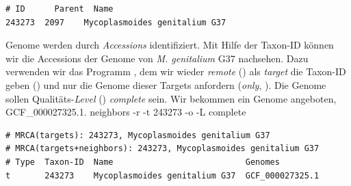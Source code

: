 \begin{verbatim}
# ID      Parent  Name
243273  2097    Mycoplasmoides genitalium G37
\end{verbatim}
\nwenddocs{}\nwdocspar
Genome werden durch \emph{Accessions} identifiziert. Mit Hilfe der
Taxon-ID können wir die Accessions der Genome von \emph{M. genitalium}
G37 nachsehen. Dazu verwenden wir das Programm , dem wir
wieder \emph{remote} () als \emph{target} die Taxon-ID geben
() und nur die Genome dieser Targets anfordern (\emph{only},
). Die Genome sollen Qualitäts-\emph{Level} ()
\emph{complete} sein. Wir bekommen ein Genome angeboten,
GCF\_000027325.1.
\nwenddocs{}\plusendmoddef\nwstartdeflinemarkup{}\nwenddeflinemarkup
neighbors -r -t 243273 -o -L complete
\nwendcode{}\nwdocspar
\small
\begin{verbatim}
# MRCA(targets): 243273, Mycoplasmoides genitalium G37
# MRCA(targets+neighbors): 243273, Mycoplasmoides genitalium G37
# Type  Taxon-ID  Name                           Genomes
t       243273    Mycoplasmoides genitalium G37  GCF_000027325.1
\end{verbatim}
\normalsize

